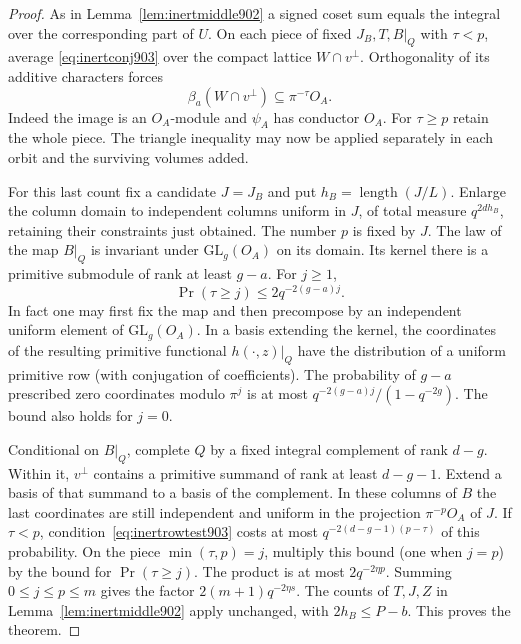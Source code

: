\documentclass[a4paper,11pt]{article}
\theoremstyle{definition}
\theoremstyle{remark}
\numberwithin{equation}{section}
\begin{document}
\begin{proof}
As in Lemma~\ref{lem:inertmiddle902} a signed coset sum equals
the integral over the corresponding part of \(U\). On each
piece of fixed \(J_B,T,B|_Q\) with \(\tau<p\), average
\eqref{eq:inertconj903} over the compact lattice \(W\cap v^\perp\).
Orthogonality of its additive characters forces
\begin{equation}
               \beta_a(W\cap v^\perp)\subseteq\pi^{-\tau}O_A .
 \label{eq:inertrowtest903}
\end{equation}
Indeed the image is an \(O_A\)-module and \(\psi_A\) has
conductor \(O_A\). For \(\tau\ge p\) retain the whole piece.
The triangle inequality may now be applied separately in each
orbit and the surviving volumes added.

For this last count fix a candidate \(J=J_B\) and put
\(h_B=\operatorname{length}(J/L)\). Enlarge the column domain
to independent columns uniform in \(J\), of total measure
\(q^{2dh_B}\), retaining their constraints just obtained.
The number \(p\) is fixed by \(J\).
The law of the map \(B|_Q\) is invariant under
\(\mathrm{GL}_g(O_A)\) on its domain. Its kernel there is a
primitive submodule of rank at least \(g-a\). For \(j\ge1\),
\[
              \Pr(\tau\ge j)\le 2q^{-2(g-a)j}.
\]
In fact one may first fix the map and then precompose by an
independent uniform element of \(\mathrm{GL}_g(O_A)\). In a
basis extending the kernel, the coordinates of the resulting
primitive functional \(h(\cdot,z)|_Q\) have the distribution
of a uniform primitive row (with conjugation of coefficients).
The probability of \(g-a\) prescribed zero coordinates
modulo \(\pi^j\) is at most
\(q^{-2(g-a)j}/(1-q^{-2g})\). The bound also holds for \(j=0\).

Conditional on \(B|_Q\), complete \(Q\) by a fixed integral
complement of rank \(d-g\). Within it, \(v^\perp\) contains a
primitive summand of rank at least \(d-g-1\). Extend a basis
of that summand to a basis of the complement. In these columns
of \(B\) the last coordinates are still independent and uniform
in the projection \(\pi^{-p}O_A\) of \(J\). If \(\tau<p\),
condition~\eqref{eq:inertrowtest903} costs at most
\(q^{-2(d-g-1)(p-\tau)}\) of this probability. On the piece
\(\min(\tau,p)=j\), multiply this bound (one when \(j=p\)) by
the bound for \(\Pr(\tau\ge j)\). The product is at most
\(2q^{-2\eta p}\). Summing \(0\le j\le p\le m\) gives the
factor \(2(m+1)q^{-2\eta s}\).
The counts of \(T,J,Z\) in Lemma~\ref{lem:inertmiddle902} apply
unchanged, with \(2h_B\le P-b\). This proves the theorem.
\end{proof}
\end{document}
